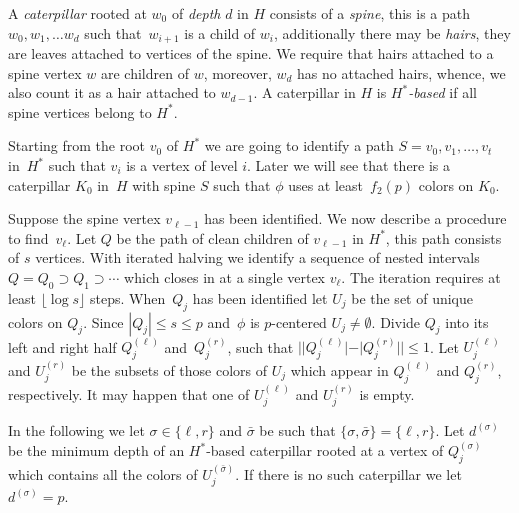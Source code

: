 \documentclass[11pt]{article}
\begin{document}
A \emph{caterpillar} rooted at $w_0$ of \emph{depth} $d$ in $H$ consists of a
\emph{spine}, this is a path $w_0,w_1,\ldots w_d$ such that~$w_{i+1}$ is a
child of $w_i$, additionally there may be \emph{hairs}, they are leaves
attached to vertices of the spine.  We require that hairs attached to a spine
vertex $w$ are children of $w$, moreover, $w_d$ has no attached hairs, whence,
we also count it as a hair attached to $w_{d-1}$.  A caterpillar in $H$ is
\emph{$H^*$-based} if all spine vertices belong to $H^*$.


Starting from the root $v_0$ of $H^*$ we are going to identify a path
$S=v_0,v_1,\ldots,v_{t}$ in~$H^*$ such that $v_i$ is a vertex of level $i$.
Later we will see that there is a caterpillar $K_0$ in~$H$ with spine $S$ 
such that $\phi$ uses at least~$f_2(p)$ colors on $K_0$. 

Suppose the spine vertex $v_{\ell-1}$ has been identified. We now describe a
procedure to find~$v_\ell$. Let $Q$ be the path of clean children of $v_{\ell-1}$ in
$H^*$, this path consists of $s$ vertices. With iterated halving we identify a
sequence of nested intervals $Q=Q_0\supset Q_1 \supset\cdots$ which closes in
at a single vertex $v_\ell$.  The iteration requires at least $\lfloor\log s\rfloor$ steps.
When~$Q_j$ has been identified let $U_j$ be the set of unique colors on
$Q_j$. Since $|Q_j|\leq s\leq p$ and~$\phi$ is $p$-centered
$U_j\neq\emptyset$. Divide $Q_j$ into its left and right half $Q_j^{(\ell)}$
and~$Q_j^{(r)}$, such that $||Q_j^{(\ell)}| - |Q_j^{(r)}||\leq 1$. Let $U_j^{(\ell)}$ and
$U_j^{(r)}$ be the subsets of those colors of $U_j$ which appear in $Q_j^{(\ell)}$ and $Q_j^{(r)}$,
respectively. It may happen that one of $U_j^{(\ell)}$ and $U_j^{(r)}$ is empty.

In the following we let $\sigma\in\{\ell,r\}$ and $\bar{\sigma}$ be such that
$\{\sigma,\bar{\sigma}\}=\{\ell,r\}$.  Let $d^{(\sigma)}$ be the minimum depth of an
$H^*$-based caterpillar rooted at a vertex of $Q_j^{(\sigma)}$ which contains
all the colors of $U_j^{(\bar{\sigma})}$.  If there is no such caterpillar we let
$d^{(\sigma)}=p$. 
\end{document}
